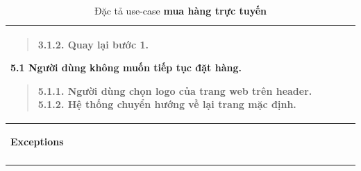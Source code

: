 {\begin{longtable}{| p{} | p{} |}
\begin{quote}
            3.1.2. Quay lại bước 1.
        \end{quote}
        5.1 Người dùng không muốn tiếp tục đặt hàng.
        \begin{quote}
            5.1.1. Người dùng chọn logo của trang web trên header.
            5.1.2. Hệ thống chuyển hướng về lại trang mặc định.
        \end{quote}
        \\
        \hline
        \begin{flushleft}
            \textbf{Exceptions}
        \end{flushleft}
         &
        \\
        \hline
        \caption{Đặc tả use-case \textbf{mua hàng trực tuyến}}
    \end{longtable}
}
